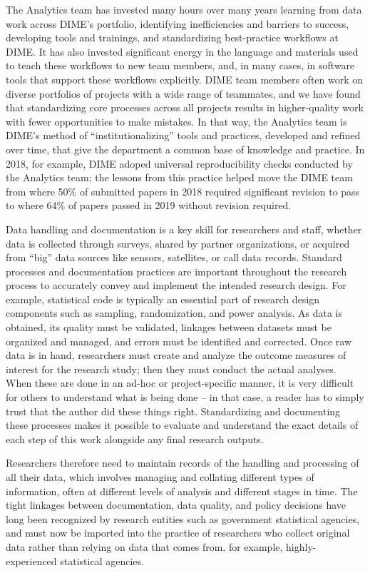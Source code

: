 The Analytics team has invested many hours over many years
learning from data work across DIME's portfolio,
identifying inefficiencies and barriers to success,
developing tools and trainings, and standardizing best-practice workflows at DIME.
It has also invested significant energy in the language and materials
used to teach these workflows to new team members,
and, in many cases, in software tools that support these workflows explicitly.
DIME team members often work on diverse portfolios of projects
with a wide range of teammates, and we have found
that standardizing core processes across all projects
results in higher-quality work with fewer opportunities to make mistakes.
In that way, the Analytics team is DIME's method of ``institutionalizing''
tools and practices, developed and refined over time,
that give the department a common base of knowledge and practice.
In 2018, for example, DIME adoped universal reproducibility checks
conducted by the Analytics team;
the lessons from this practice helped move the DIME team
from where 50\% of submitted papers in 2018
required significant revision to pass
to where 64\% of papers passed in 2019 without revision required.

Data handling and documentation is a key skill for researchers and staff, 
whether data is collected through surveys, shared by partner organizations,
or acquired from ``big'' data sources like sensors, satellites, or call data records.
Standard processes and documentation practices
are important throughout the research process to accurately convey
and implement the intended research design.\cite{vilhuber_lars_2020_3911311}
For example, statistical code is typically an essential part of
research design components such as sampling, randomization, and power analysis.
As data is obtained, its quality must be validated,
linkages between datasets must be organized and managed,
and errors must be identified and corrected.
Once raw data is in hand, researchers must create and analyze the 
outcome measures of interest for the research study;
then they must conduct the actual analyses.
When these are done in an ad-hoc or project-specific manner,
it is very difficult for others to understand what is being done --
in that case, a reader has to simply trust that the author did these things right.
Standardizing and documenting these processes
makes it possible to evaluate and understand
the exact details of each step of this work
alongside any final research outputs.

Researchers therefore need to maintain records of the handling and processing of all their data,
which involves managing and collating different types of information,
often at different levels of analysis and different stages in time.
The tight linkages between documentation, data quality, and policy decisions
have long been recognized by research entities such as government statistical agencies,\cite{jepdataquality}
and must now be imported into the practice of researchers who collect original data
rather than relying on data that comes from, for example, highly-experienced statistical agencies.

